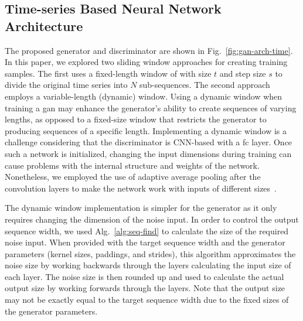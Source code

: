 



\subsection{Time-series Based Neural Network Architecture}
The proposed generator and discriminator are shown in Fig.~\ref{fig:gan-arch-time}. In this paper, we explored two sliding window approaches for creating training samples. The first uses a fixed-length window of with size $t$ and step size $s$ to divide the
original time series into $N$ sub-sequences. The second approach employs a variable-length (dynamic) window. Using a dynamic window when training a \gls*{gan} may enhance the generator's ability to create sequences of varying lengths, as opposed to a fixed-size window that restricts the generator to producing sequences of a specific length.
%
Implementing a dynamic window is a challenge considering that the discriminator is CNN-based with a \gls*{fc} layer. Once such a network is initialized, changing the input dimensions during training can cause problems with the internal structure and weights of the network. Nonetheless, we employed the use of adaptive average pooling after the convolution layers to make the network work with inputs of different sizes~\cite{he_spatial_2014}. 

The dynamic window implementation is simpler for the generator as it only requires changing the dimension of the noise input.  In order to control the output sequence width, we used Alg.~\ref{alg:seq-find} to calculate the size of the required noise input. When provided with the target sequence width and the generator parameters (kernel sizes, paddings, and strides), this algorithm approximates the noise size by working backwards through the layers calculating the input size of each layer. The noise size is then rounded up and used to calculate the actual output size by working forwards through the layers. Note that the output size may not be exactly equal to the target sequence width due to the fixed sizes of the generator parameters. 



